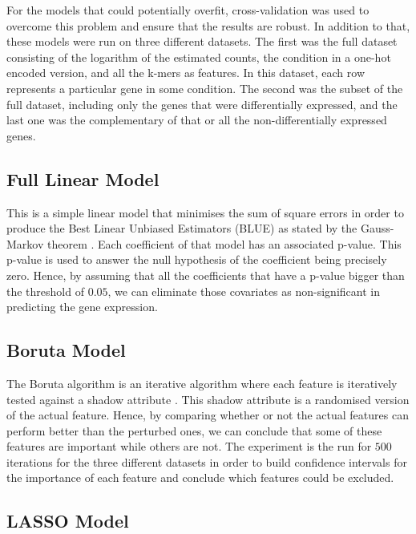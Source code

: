 \documentclass[11pt,twoside]{article}
\numberwithin{Theorem}{section}
\numberwithin{Definition}{section}
\numberwithin{Lemma}{section}
\numberwithin{Algorithm}{section}
\numberwithin{equation}{section}
\begin{document}
For the models that could potentially overfit, cross-validation was used to overcome this problem and ensure that the results are robust. In addition to that, these models were run on three different datasets. The first was the full dataset consisting of the logarithm of the estimated counts, the condition in a one-hot encoded version, and all the k-mers as features. In this dataset, each row represents a particular gene in some condition. The second was the subset of the full dataset, including only the genes that were differentially expressed, and the last one was the complementary of that or all the non-differentially expressed genes. 

\subsection{Full Linear Model}
\label{sec:full}

This is a simple linear model that minimises the sum of square errors in order to produce the Best Linear Unbiased Estimators (BLUE) as stated by the Gauss-Markov theorem \cite{eaton1983gauss}. Each coefficient of that model has an associated p-value. This p-value is used to answer the null hypothesis of the coefficient being precisely zero. Hence, by assuming that all the coefficients that have a p-value bigger than the threshold of $0.05$, we can eliminate those covariates as non-significant in predicting the gene expression. 

\subsection{Boruta Model}
\label{sec:boruta}

The Boruta algorithm is an iterative algorithm where each feature is iteratively tested against a shadow attribute \cite{kursa2010feature}. This shadow attribute is a randomised version of the actual feature. Hence, by comparing whether or not the actual features can perform better than the perturbed ones, we can conclude that some of these features are important while others are not. The experiment is the run for $500$ iterations for the three different datasets in order to build confidence intervals for the importance of each feature and conclude which features could be excluded. 

\subsection{LASSO Model}
\label{sec:lasso}
\end{document}
